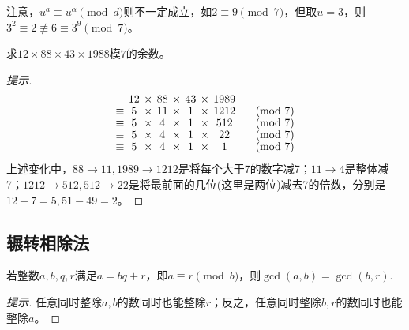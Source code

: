 
注意，$u^a\equiv u^{\alpha}\pmod d$则不一定成立，如$2\equiv9\pmod7$，但取$u=3$，则$3^2\equiv2\not\equiv6\equiv 3^9\pmod7$。

\begin{question}
  求$12\times88\times43\times1988$模$7$的余数。
\end{question}
\begin{proof}[提示]
  \begin{align*}\renewcommand{\arraystretch}{.9}\setlength\arraycolsep{2pt}
    \begin{array}{ccccccccl}
             & 12 & \times & 88 & \times & 43 & \times & 1989 &\\
      \equiv & 5  & \times & 11 & \times & 1  & \times & 1212 &\quad\pmod7\\
      \equiv & 5  & \times & 4  & \times & 1  & \times & 512  &\quad\pmod7\\
      \equiv & 5  & \times & 4  & \times & 1  & \times & 22   &\quad\pmod7\\
      \equiv & 5  & \times & 4  & \times & 1  & \times & 1    &\quad\pmod7
    \end{array}
  \end{align*}
  上述变化中，$88\to 11, 1989\to1212$是将每个大于7的数字减7；$11\to4$是整体减7；$1212\to512,512\to22$是将最前面的几位(这里是两位)减去7的倍数，分别是$12-7=5, 51-49=2$。
\end{proof}

\subsection{辗转相除法}
\label{sec:Euclidean-algorithm}

\begin{theorem}\label{th:euclidean-algorithm-theorem}
  若整数$a,b,q,r$满足$a=bq+r$，即$a\equiv r\pmod b$，则$\gcd(a,b)=\gcd(b,r).$
\end{theorem}
\begin{proof}[提示]
  任意同时整除$a,b$的数同时也能整除$r$；反之，任意同时整除$b,r$的数同时也能整除$a$。
\end{proof}

